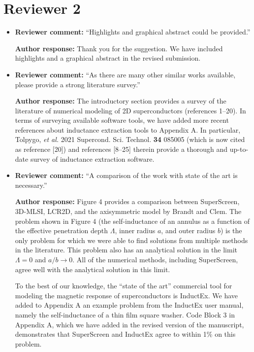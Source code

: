 \documentclass{article} %
\begin{document}
\section{Reviewer 2}
\begin{itemize}
    \item{
    {\bf Reviewer comment:} ``Highlights and graphical abstract could be provided.''
    
    {\bf Author response:} Thank you for the suggestion. We have included highlights and a graphical abstract in the revised submission.
    }
    \item{
    {\bf Reviewer comment:} ``As there are many other similar works available, please provide a strong literature survey.''
    
    {\bf Author response:} The introductory section provides a survey of the literature of numerical modeling of 2D superconductors (references 1--20). In terms of surveying available software tools, we have added more recent references about inductance extraction tools to Appendix A. In particular, Tolpygo, \textit{et al.} 2021 Supercond. Sci. Technol. {\bf 34} 085005 (which is now cited as reference [20]) and references [8--25] therein provide a thorough and up-to-date survey of inductance extraction software.
    }
    \item{
    {\bf Reviewer comment:} ``A comparison of the work with state of the art is necessary.''
    
    {\bf Author response:} Figure 4 provides a comparison between SuperScreen, 3D-MLSI, LCR2D, and the axisymmetric model by  Brandt and Clem. The problem shown in Figure 4 (the self-inductance of an annulus as a function of the effective penetration depth $\Lambda$, inner radius $a$, and outer radius $b$) is the only problem for which we were able to find solutions from multiple methods in the literature. This problem also has an analytical solution in the limit $\Lambda=0$ and $a/b\to 0$. All of the numerical methods, including SuperScreen, agree well with the analytical solution in this limit.
    
    To the best of our knowledge, the ``state of the art'' commercial tool for modeling the magnetic response of superconductors is InductEx. We have added to Appendix A an example problem from the InductEx user manual, namely the self-inductance of a thin film square washer. Code Block 3 in Appendix A, which we have added in the revised version of the manuscript, demonstrates that SuperScreen and InductEx agree to within 1\% on this problem.
    }
\end{itemize}
\end{document}
